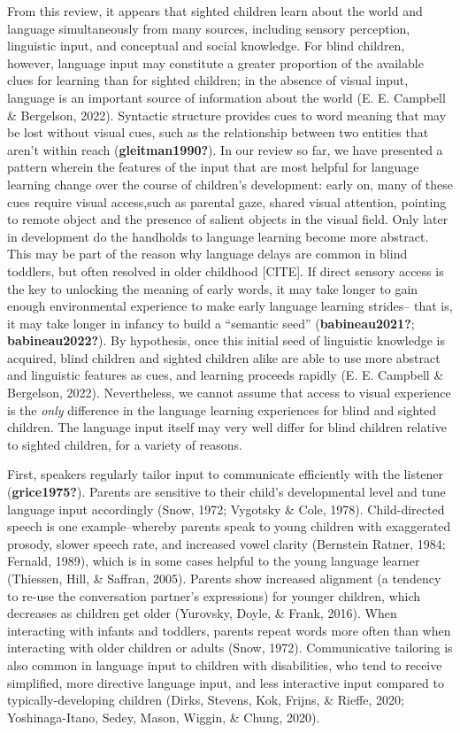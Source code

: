 \documentclass[
  man,floatsintext]{apa6}
\begin{document}
From this review, it appears that sighted children learn about the world and language simultaneously from many sources, including sensory perception, linguistic input, and conceptual and social knowledge. For blind children, however, language input may constitute a greater proportion of the available clues for learning than for sighted children; in the absence of visual input, language is an important source of information about the world (E. E. Campbell \& Bergelson, 2022). Syntactic structure provides cues to word meaning that may be lost without visual cues, such as the relationship between two entities that aren't within reach (\textbf{gleitman1990?}). In our review so far, we have presented a pattern wherein the features of the input that are most helpful for language learning change over the course of children's development: early on, many of these cues require visual access,such as parental gaze, shared visual attention, pointing to remote object and the presence of salient objects in the visual field. Only later in development do the handholds to language learning become more abstract. This may be part of the reason why language delays are common in blind toddlers, but often resolved in older childhood {[}CITE{]}. If direct sensory access is the key to unlocking the meaning of early words, it may take longer to gain enough environmental experience to make early language learning strides-- that is, it may take longer in infancy to build a ``semantic seed'' (\textbf{babineau2021?}; \textbf{babineau2022?}). By hypothesis, once this initial seed of linguistic knowledge is acquired, blind children and sighted children alike are able to use more abstract and linguistic features as cues, and learning proceeds rapidly (E. E. Campbell \& Bergelson, 2022). Nevertheless, we cannot assume that access to visual experience is the \emph{only} difference in the language learning experiences for blind and sighted children. The language input itself may very well differ for blind children relative to sighted children, for a variety of reasons.

First, speakers regularly tailor input to communicate efficiently with the listener (\textbf{grice1975?}). Parents are sensitive to their child's developmental level and tune language input accordingly (Snow, 1972; Vygotsky \& Cole, 1978). Child-directed speech is one example--whereby parents speak to young children with exaggerated prosody, slower speech rate, and increased vowel clarity (Bernstein Ratner, 1984; Fernald, 1989), which is in some cases helpful to the young language learner (Thiessen, Hill, \& Saffran, 2005). Parents show increased alignment (a tendency to re-use the conversation partner's expressions) for younger children, which decreases as children get older (Yurovsky, Doyle, \& Frank, 2016). When interacting with infants and toddlers, parents repeat words more often than when interacting with older children or adults (Snow, 1972). Communicative tailoring is also common in language input to children with disabilities, who tend to receive simplified, more directive language input, and less interactive input compared to typically-developing children (Dirks, Stevens, Kok, Frijns, \& Rieffe, 2020; Yoshinaga-Itano, Sedey, Mason, Wiggin, \& Chung, 2020).
\end{document}
